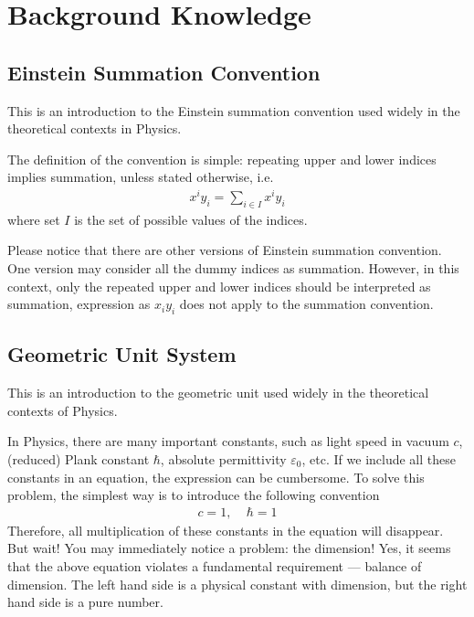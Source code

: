 \documentclass[letterpaper,10pt,english]{sphinxmanual}
\begin{document}
\chapter{Background Knowledge}
\label{\detokenize{background::doc}}\label{\detokenize{background:background-knowledge}}

\section{Einstein Summation Convention}
\label{\detokenize{bg_eins:einstein-summation-convention}}\label{\detokenize{bg_eins::doc}}
This is an introduction to the Einstein summation convention used widely in the theoretical contexts in Physics.

The definition of the convention is simple: repeating upper and lower indices implies summation, unless stated otherwise, i.e.
\begin{equation*}
\begin{split}x^iy_i = \sum_{i\in I}x^iy_i\end{split}
\end{equation*}
where set \(I\) is the set of possible values of the indices.

Please notice that there are other versions of Einstein summation convention. One version may consider all the dummy indices as summation. However, in this context, only the repeated upper and lower indices should be interpreted as summation, expression as \(x_iy_i\) does not apply to the summation convention.


\section{Geometric Unit System}
\label{\detokenize{bg_geo_unit:geometric-unit-system}}\label{\detokenize{bg_geo_unit::doc}}
This is an introduction to the geometric unit used widely in the theoretical contexts of Physics.

In Physics, there are many important constants, such as light speed in vacuum \(c\), (reduced) Plank constant \(\hbar\), absolute permittivity \(\varepsilon_0\), etc. If we include all these constants in an equation, the expression can be cumbersome. To solve this problem, the simplest way is to introduce the following convention
\begin{equation*}
\begin{split}c=1,\ \ \ \ \ \hbar=1\end{split}
\end{equation*}
Therefore, all multiplication of these constants in the equation will disappear. But wait! You may immediately notice a problem: the dimension! Yes, it seems that the above equation violates a fundamental requirement — balance of dimension. The left hand side is a physical constant with dimension, but the right hand side is a pure number.
\end{document}
